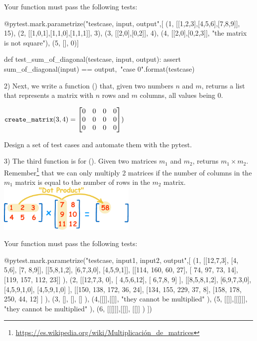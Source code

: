 \documentclass[
  fontsize=10pt,
  a4paper,
]{scrartcl}
\begin{document}
\begin{enumerate}
Your function must pass the following tests:

\begin{small}
\begin{python}
@pytest.mark.parametrize("testcase, input, output",[
(1, [[1,2,3],[4,5,6],[7,8,9]], 15),
(2, [[1,0,1],[1,1,0],[1,1,1]], 3),
(3, [[2,0],[0,2]], 4),
(4, [[2,0],[0,2,3]], "the matrix is not square"),
(5, [], 0)]

def test_sum_of_diagonal(testcase, input, output):
    assert sum_of_diagonal(input) == output,\
           "case {0}".format(testcase)
\end{python}
\end{small}

2) Next, we write a function () that, given two numbers $n$ and $m$, returns a list that represents a matrix with $n$ rows and $m$ columns, all values being 0.

$
{\tt create\_matrix}(3,4) = 
\begin{bmatrix}
    0 & 0 & 0 & 0 \\
    0 & 0 & 0 & 0 \\
    0 & 0 & 0 & 0 \\
\end{bmatrix})
$

Design a set of test cases and automate them with the pytest.

3) The third function is for (). Given two matrices $m_1$ and $m_2$, returns $m_1 \times m_2$. Remember\footnote{\url{https://es.wikipedia.org/wiki/Multiplicación_de_matrices}}
that we can only multiply 2 matrices if the number of columns in the $m_1$ matrix is equal to the number of rows in the $m_2$ matrix.\\

\includegraphics[width=0.5\textwidth]{images/mult-matrix.png}

Your function must pass the following tests:

\begin{small}
\begin{python}
@pytest.mark.parametrize("testcase, input1, input2, output",[
(1, [[12,7,3], 
     [4, 5,6], 
     [7, 8,9]],
    [[5,8,1,2],
     [6,7,3,0],
     [4,5,9,1]],
    [[114, 160,  60, 27], 
     [ 74,  97,  73, 14], 
     [119, 157, 112, 23]]
),
(2, [[12,7,3, 0], 
     [ 4,5,6,12], 
     [ 6,7,8, 9]
    ],
    [[8,5,8,1,2],
     [6,9,7,3,0],
     [4,5,9,1,0],
     [4,5,9,1,0]
    ],
    [[150, 138, 172, 36, 24], 
     [134, 155, 229, 37, 8], 
     [158, 178, 250, 44, 12]
    ]
),
(3, [], [], []
),
(4,[[]],[[]], "they cannot be multiplied"
),
(5, [[]],[[[]]], "they cannot be multiplied"
),
(6, [[[]]],[[]], [[]]
)
])


\end{python}
\end{small}
\end{enumerate}
\end{document}

